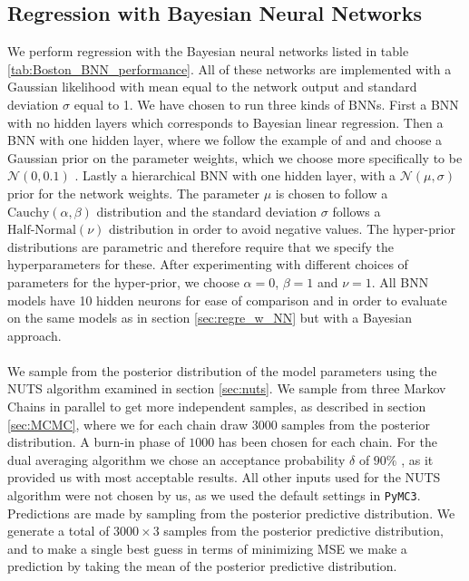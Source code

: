 \subsection{Regression with Bayesian Neural
Networks}\label{subsec:regression_w_bnn}
We perform regression with the Bayesian neural networks listed in table \ref{tab:Boston_BNN_performance}. All of these networks are implemented with a Gaussian likelihood with mean equal to the network output and standard deviation $\sigma$ equal to 1. We have chosen to run three kinds of BNNs. First a BNN with no hidden layers which corresponds to Bayesian linear regression. Then a BNN with one hidden layer, where we follow the example of \cite{mackay1991} and \cite{MacKay1992} and choose a Gaussian prior on the parameter weights, which we choose more specifically to be $\mathcal{N}(0,0.1)$ . Lastly a hierarchical BNN with one hidden layer, with a $\mathcal{N}(\mu,\sigma)$ prior for the network weights. The parameter $\mu$ is chosen to follow a $\text{Cauchy}(\alpha,\beta)$ distribution and the standard deviation $\sigma$ follows a $\text{Half-Normal}(\nu)$ distribution in order to avoid negative values. The hyper-prior distributions are parametric and therefore require that we specify the hyperparameters for these.
After experimenting with different choices of parameters for the hyper-prior, we choose $\alpha=0$, $\beta=1$ and $\nu=1$. All BNN models have 10 hidden neurons for ease of comparison and in order to evaluate on the same models as in section \ref{sec:regre_w_NN} but with a Bayesian approach. \\
\\
We sample from the posterior distribution of the model parameters using the NUTS algorithm examined in section \ref{sec:nuts}.
We sample from three Markov Chains in parallel to get more independent samples, as described in section \ref{sec:MCMC}, where we for each chain draw $3000$ samples from the posterior distribution. A burn-in phase of $1000$ has been chosen for each chain. For the dual averaging algorithm we chose an
acceptance probability $\delta$ of $90\%$ , as it provided us with most acceptable results. All other inputs used for the NUTS algorithm were not chosen by us, as we used the default settings in \texttt{PyMC3}. 
Predictions are made by sampling from the posterior predictive distribution. We generate a total of $3000 \times 3$ samples from the posterior predictive distribution, and to make a single best guess in terms of minimizing MSE we make a prediction by taking the mean of the posterior predictive distribution. 
